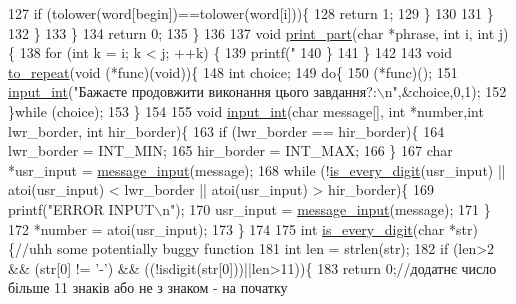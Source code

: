 \begin{DoxyCodeInclude}
{{127                 \textcolor{keywordflow}{if} (tolower(word[begin])==tolower(word[i]))\{
128                     \textcolor{keywordflow}{return} 1;
129                 \}
130 
131             \}
132         \}
133     \}
134     \textcolor{keywordflow}{return} 0;
135 \}
136 
137 \textcolor{keywordtype}{void} \hyperlink{main_8c_aade7efb4781be6777c4015fa8610569f}{print\_part}(\textcolor{keywordtype}{char} *phrase, \textcolor{keywordtype}{int} i, \textcolor{keywordtype}{int} j)\{
138     \textcolor{keywordflow}{for} (\textcolor{keywordtype}{int} k = i; k < j; ++k) \{
139         printf(\textcolor{stringliteral}{"%
140     \}
141 \}
142 
143 \textcolor{keywordtype}{void} \hyperlink{main_8c_a590198f8fc1086cc47278ee8ddfa08d2}{to\_repeat}(\textcolor{keywordtype}{void} (*func)(\textcolor{keywordtype}{void}))\{
148     \textcolor{keywordtype}{int} choice;
149     \textcolor{keywordflow}{do}\{
150         (*func)();
151         \hyperlink{main_8c_a6f453bc035d85e967bd5032eca31a155}{input\_int}(\textcolor{stringliteral}{"Бажаєте продовжити виконання цього завдання?:\(\backslash\)n"},&choice,0,1);
152     \}\textcolor{keywordflow}{while} (choice);
153 \}
154 
155 \textcolor{keywordtype}{void} \hyperlink{main_8c_a6f453bc035d85e967bd5032eca31a155}{input\_int}(\textcolor{keywordtype}{char} message[], \textcolor{keywordtype}{int} *number,\textcolor{keywordtype}{int} lwr\_border, \textcolor{keywordtype}{int} hir\_border)\{
163     \textcolor{keywordflow}{if} (lwr\_border == hir\_border)\{
164         lwr\_border = INT\_MIN;
165         hir\_border = INT\_MAX;
166     \}
167     \textcolor{keywordtype}{char} *usr\_input = \hyperlink{main_8c_a638293d509eded9d6ef7552ae1b17f2b}{message\_input}(message);
168     \textcolor{keywordflow}{while} (!\hyperlink{main_8c_a9594b83ee908d195f5ff508da5c23c58}{is\_every\_digit}(usr\_input) || atoi(usr\_input) < lwr\_border || atoi(usr\_input) > 
      hir\_border)\{
169         printf(\textcolor{stringliteral}{"ERROR INPUT\(\backslash\)n"});
170         usr\_input = \hyperlink{main_8c_a638293d509eded9d6ef7552ae1b17f2b}{message\_input}(message);
171     \}
172     *number = atoi(usr\_input);
173 \}
174 
175 \textcolor{keywordtype}{int} \hyperlink{main_8c_a9594b83ee908d195f5ff508da5c23c58}{is\_every\_digit}(\textcolor{keywordtype}{char} *str)\{\textcolor{comment}{//uhh some potentially buggy function}
181 \textcolor{comment}{}    \textcolor{keywordtype}{int} len = strlen(str);
182     \textcolor{keywordflow}{if} (len>2 && (str[0] != \textcolor{charliteral}{'-'}) && ((!isdigit(str[0]))||len>11))\{
183         \textcolor{keywordflow}{return} 0;\textcolor{comment}{//додатнє число більше 11 знаків або не з знаком - на початку}
}}}
\end{DoxyCodeInclude}
